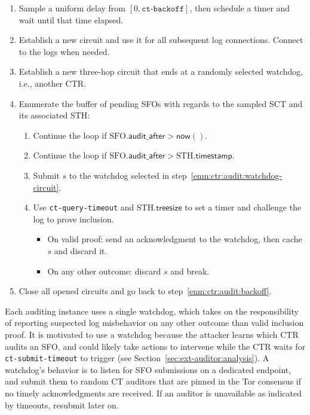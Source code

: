 \begin{enumerate}
	\item\label{enm:ctr:audit:backoff} Sample a uniform delay from
			$[0, \texttt{ct-backoff}]$,
		then schedule a timer and wait until that time elapsed.
	\item\label{enm:ctr:audit:log-circuit} Establish a new circuit and use it
		for all subsequent log connections.  Connect to the logs when needed.
	\item\label{enm:ctr:audit:watchdog-circuit} Establish a new three-hop
		circuit that ends at a randomly selected watchdog, i.e., another CTR.
	\item\label{enm:ctr:audit:loop} Enumerate the buffer of pending SFOs with
		regards to the sampled SCT and its associated STH:
		\begin{enumerate}
			\item\label{enm:ctr:audit:too-soon} Continue the loop if
				$\textrm{SFO}.\mathsf{audit\_after} > \mathsf{now}()$.
			\item\label{enm:ctr:audit:too-soon2} Continue the loop if
				$\textrm{SFO}.\mathsf{audit\_after} >
					\textrm{STH}.\mathsf{timestamp}$.
			\item\label{enm:ctr:audit:watchdog} Submit $s$ to the
				watchdog selected in step~\ref{enm:ctr:audit:watchdog-circuit}.
			\item\label{enm:ctr:audit:challenge} Use \texttt{ct-query-timeout}
				and $\textrm{STH}.\mathsf{treesize}$ to set a timer and
				challenge the log to prove inclusion.
				\begin{itemize}
					\item On valid proof: send an acknowledgment to the
						watchdog, then cache $s$ and discard it.
					\item On any other outcome: discard $s$ and break.
				\end{itemize}
		\end{enumerate}
	\item\label{enm:ctr:audit:teardown} Close all opened circuits and go back to
		step~\ref{enm:ctr:audit:backoff}.
\end{enumerate}

Each auditing instance uses a single watchdog, which takes on the responsibility
of reporting suspected log misbehavior on any other outcome than valid inclusion
proof.  It is motivated to use a watchdog because the attacker learns which
CTR audits an SFO, and could likely take actions to intervene while the CTR
waits for \texttt{ct-submit-timeout} to trigger (see
Section~\ref{sec:ext-auditor:analysis}).  A watchdog's behavior is to listen for
SFO submissions on a dedicated endpoint, and submit them to random CT auditors
that are pinned in the Tor consensus if no timely acknowledgments are received.
If an auditor is unavailable as indicated by timeouts, resubmit later on.

